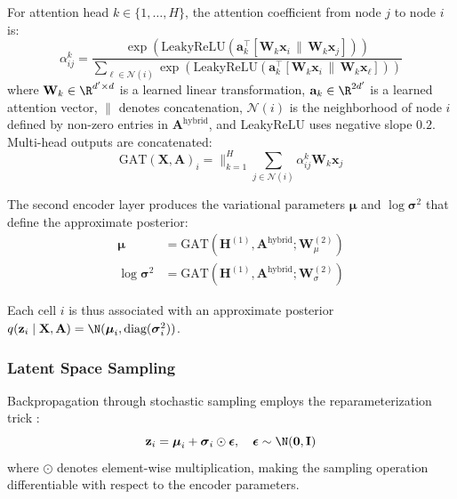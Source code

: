 \documentclass{article}
\begin{document}
For attention head $k \in \{1, \ldots, H\}$, the attention coefficient from node $j$ to node $i$ is:
\begin{equation}
    \alpha^{k}_{ij} = \frac{
        \exp\!\left(\text{LeakyReLU}\!\left(\mathbf{a}_k^\top [\mathbf{W}_k \mathbf{x}_i \,\|\, \mathbf{W}_k \mathbf{x}_j]\right)\right)
    }{
        \sum_{\ell \in \mathcal{N}(i)} \exp\!\left(\text{LeakyReLU}\!\left(\mathbf{a}_k^\top [\mathbf{W}_k \mathbf{x}_i \,\|\, \mathbf{W}_k \mathbf{x}_\ell]\right)\right)
    }
    \label{eq:attention}
\end{equation}
where $\mathbf{W}_k \in \R^{d' \times d}$ is a learned linear transformation, $\mathbf{a}_k \in \R^{2d'}$ is a learned attention vector, $\|$ denotes concatenation, $\mathcal{N}(i)$ is the neighborhood of node $i$ defined by non-zero entries in $\mathbf{A}^{\text{hybrid}}$, and LeakyReLU uses negative slope $0.2$. Multi-head outputs are concatenated:
\begin{equation}
    \text{GAT}(\mathbf{X}, \mathbf{A})_i = \Big\|_{k=1}^{H} \sum_{j \in \mathcal{N}(i)} \alpha^k_{ij} \mathbf{W}_k \mathbf{x}_j
    \label{eq:multihead}
\end{equation}

The second encoder layer produces the variational parameters $\boldsymbol{\mu}$ and $\log \boldsymbol{\sigma}^2$ that define the approximate posterior:
\begin{align}
    \boldsymbol{\mu} &= \text{GAT}(\mathbf{H}^{(1)}, \mathbf{A}^{\text{hybrid}}; \mathbf{W}^{(2)}_\mu) \label{eq:mu} \\
    \log \boldsymbol{\sigma}^2 &= \text{GAT}(\mathbf{H}^{(1)}, \mathbf{A}^{\text{hybrid}}; \mathbf{W}^{(2)}_\sigma) \label{eq:sigma}
\end{align}

Each cell $i$ is thus associated with an approximate posterior $q(\mathbf{z}_i \mid \mathbf{X}, \mathbf{A}) = \N(\boldsymbol{\mu}_i, \text{diag}(\boldsymbol{\sigma}_i^2))$.

\subsubsection{Latent Space Sampling}

Backpropagation through stochastic sampling employs the reparameterization trick \cite{kingma2013auto}:
\begin{equation}
    \mathbf{z}_i = \boldsymbol{\mu}_i + \boldsymbol{\sigma}_i \odot \boldsymbol{\epsilon}, \quad \boldsymbol{\epsilon} \sim \N(\mathbf{0}, \mathbf{I})
    \label{eq:reparam}
\end{equation}
where $\odot$ denotes element-wise multiplication, making the sampling operation differentiable with respect to the encoder parameters.
\end{document}
